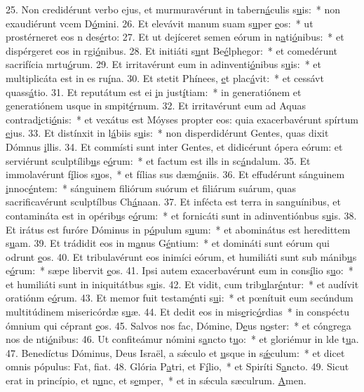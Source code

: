25. Non credidérunt verbo ejus, et murmuravérunt in tabern\uline{á}culis s\uline{u}is:~* non exaudiérunt vcem D\uline{ó}mini.
26. Et elevávit manum suam s\uline{u}per \uline{e}os:~* ut prostérneret eos n des\uline{é}rto:
27. Et ut dejíceret semen eórum in n\uline{a}ti\uline{ó}nibus:~* et dispérgeret eos in rgi\uline{ó}nibus.
28. Et initiáti s\uline{u}nt Be\uline{é}lphegor:~* et comedérunt sacrifícia mrtu\uline{ó}rum.
29. Et irritavérunt eum in adinventi\uline{ó}nibus s\uline{u}is:~* et multiplicáta est in es ru\uline{í}na.
30. Et stetit Phínees, \uline{e}t plac\uline{á}vit:~* et cessávt quass\uline{á}tio.
31. Et reputátum est ei \uline{i}n just\uline{í}tiam:~* in generatiónem et generatiónem usque in smpit\uline{é}rnum.
32. Et irritavérunt eum ad Aquas contrad\uline{i}cti\uline{ó}nis:~* et vexátus est Móyses propter eos: quia exacerbavérunt spírtum \uline{e}jus.
33. Et distínxit in l\uline{á}biis s\uline{u}is:~* non disperdidérunt Gentes, quas dixit Dómnus \uline{i}llis.
34. Et commísti sunt inter Gentes, et didicérunt ópera eórum: et serviérunt sculptílib\uline{u}s e\uline{ó}rum:~* et factum est ills in sc\uline{á}ndalum.
35. Et immolavérunt f\uline{í}lios s\uline{u}os,~* et fílias sus dæm\uline{ó}niis.
36. Et effudérunt sánguinem \uline{i}nnoc\uline{é}ntem:~* sánguinem filiórum suórum et filiárum suárum, quas sacrificavérunt sculptílbus Ch\uline{á}naan.
37. Et infécta est terra in sanguínibus, et contamináta est in opérib\uline{u}s e\uline{ó}rum:~* et fornicáti sunt in adinventiónbus s\uline{u}is.
38. Et irátus est furóre Dóminus in p\uline{ó}pulum s\uline{u}um:~* et abominátus est heredittem s\uline{u}am.
39. Et trádidit eos in m\uline{a}nus G\uline{é}ntium:~* et domináti sunt eórum qui odrunt \uline{e}os.
40. Et tribulavérunt eos inimíci eórum, et humiliáti sunt sub mánib\uline{u}s e\uline{ó}rum:~* sæpe libervit \uline{e}os.
41. Ipsi autem exacerbavérunt eum in cons\uline{í}lio s\uline{u}o:~* et humiliáti sunt in iniquitátbus s\uline{u}is.
42. Et vidit, cum trib\uline{u}lar\uline{é}ntur:~* et audívit oratiónm e\uline{ó}rum.
43. Et memor fuit testam\uline{é}nti s\uline{u}i:~* et pœnítuit eum secúndum multitúdinem misericórdæ s\uline{u}æ.
44. Et dedit eos in mis\uline{e}ric\uline{ó}rdias~* in conspéctu ómnium qui céprant \uline{e}os.
45. Salvos nos fac, Dómine, D\uline{e}us n\uline{o}ster:~* et cóngrega nos de nti\uline{ó}nibus:
46. Ut confiteámur nómini s\uline{a}ncto t\uline{u}o:~* et gloriémur in lde t\uline{u}a.
47. Benedíctus Dóminus, Deus Israël, a sǽculo et \uline{u}sque in s\uline{ǽ}culum:~* et dicet omnis pópulus: Fat, f\uline{i}at.
48. Glória P\uline{a}tri, et F\uline{í}lio,~* et Spiríti S\uline{a}ncto.
49. Sicut erat in princípio, et n\uline{u}nc, et s\uline{e}mper,~* et in sǽcula sæculrum. \uline{A}men.
